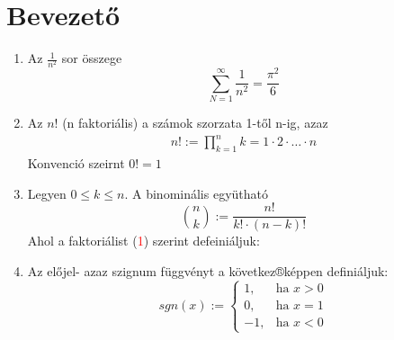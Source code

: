 \documentclass{article}
\begin{document}
    \section{Bevezető}
        \begin{enumerate}[label=(\alph*)]
            \item Az $\frac{1}{n^2}$ sor összege
                $$\sum_{N=1}^\infty \frac{1}{n^2} = \frac{\pi^2}{6}$$
            \item Az $n!$ (n faktoriális) a számok szorzata 1-től n-ig, azaz
                \begin{gather}
                    n! := \prod_{k=1}^nk = 1 \cdot 2 \cdot \dotsc \cdot n
                \end{gather}
                Konvenció szeirnt $0!=1$
            \item Legyen $0 \leq k \leq n$. A binominális együtható
                $$\binom{n}{k} := \frac{n!}{k! \cdot (n-k)!}$$
                Ahol a faktoriálist (\textcolor{red}{1}) szerint defeiniáljuk:
            \item Az előjel- azaz szignum függvényt a következ®képpen definiáljuk:
                $$sgn(x):=
    					\left\{
    						\begin{array}{ll}
    							1, & \mbox{ha } x > 0\\
    							0, & \mbox{ha } x = 1\\
    							-1, & \mbox{ha } x < 0
    						\end{array}
    					\right.$$
        \end{enumerate}
    
    \newpage
\end{document}
